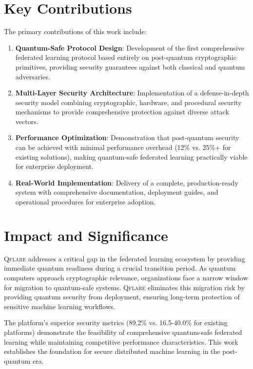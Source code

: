 \documentclass[12pt,a4paper,twoside]{book}
\newcommand{\qflare}{\textsc{Qflare}}
\begin{document}
\section{Key Contributions}
\label{sec:key-contributions}

The primary contributions of this work include:

\begin{enumerate}
\item \textbf{Quantum-Safe Protocol Design}: Development of the first comprehensive federated learning protocol based entirely on post-quantum cryptographic primitives, providing security guarantees against both classical and quantum adversaries.

\item \textbf{Multi-Layer Security Architecture}: Implementation of a defense-in-depth security model combining cryptographic, hardware, and procedural security mechanisms to provide comprehensive protection against diverse attack vectors.

\item \textbf{Performance Optimization}: Demonstration that post-quantum security can be achieved with minimal performance overhead (12\% vs. 25\%+ for existing solutions), making quantum-safe federated learning practically viable for enterprise deployment.

\item \textbf{Real-World Implementation}: Delivery of a complete, production-ready system with comprehensive documentation, deployment guides, and operational procedures for enterprise adoption.
\end{enumerate}

\section{Impact and Significance}
\label{sec:impact}

\qflare{} addresses a critical gap in the federated learning ecosystem by providing immediate quantum readiness during a crucial transition period. As quantum computers approach cryptographic relevance, organizations face a narrow window for migration to quantum-safe systems. \qflare{} eliminates this migration risk by providing quantum security from deployment, ensuring long-term protection of sensitive machine learning workflows.

The platform's superior security metrics (89.2\% vs. 16.5-40.0\% for existing platforms) demonstrate the feasibility of comprehensive quantum-safe federated learning while maintaining competitive performance characteristics. This work establishes the foundation for secure distributed machine learning in the post-quantum era.
\end{document}
